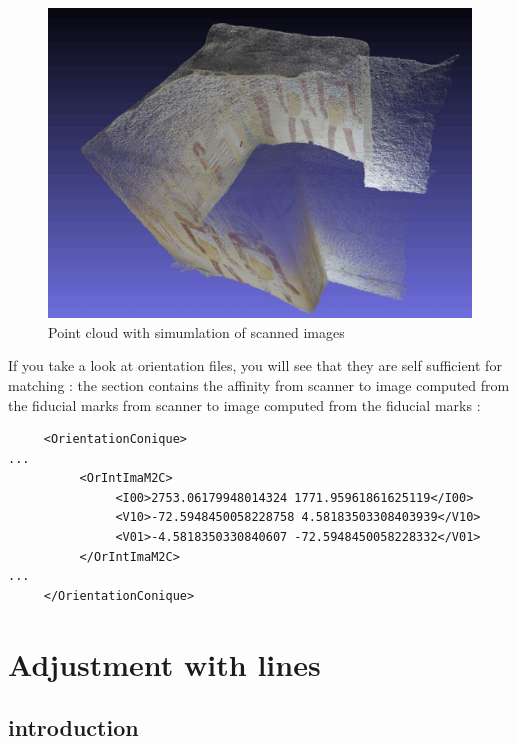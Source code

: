 \begin{figure}
   \includegraphics[width=120mm]{FIGS/Niche/snapshot00.jpg}
\caption{Point cloud with simumlation of scanned images}
\label{ImNiche}
\end{figure}


If you take a look at orientation files, you will see that they are self sufficient for
matching : the {\tt <OrIntImaM2C>}  section contains the affinity from scanner to image computed
from the fiducial marks from scanner to image computed
from the fiducial marks :

\begin{verbatim}
     <OrientationConique>
...
          <OrIntImaM2C>
               <I00>2753.06179948014324 1771.95961861625119</I00>
               <V10>-72.5948450058228758 4.58183503308403939</V10>
               <V01>-4.5818350330840607 -72.5948450058228332</V01>
          </OrIntImaM2C>
...
     </OrientationConique>
\end{verbatim}



\section{Adjustment with lines}



\subsection{introduction}

